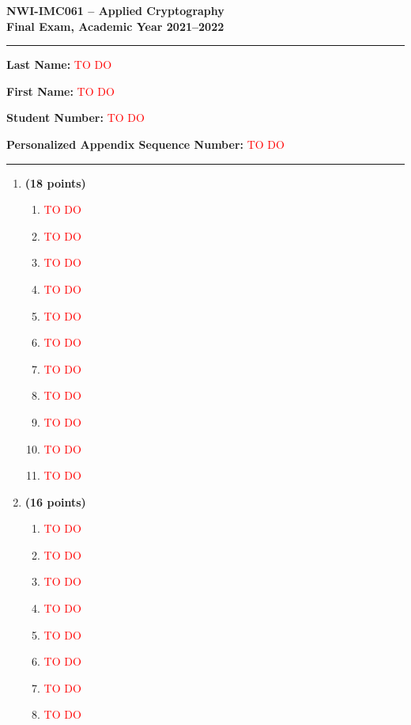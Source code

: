 \documentclass[a4paper]{article}
\newcommand{\TODO}{\textcolor{red}{TO DO}}
\begin{document}
\begin{center}
  \textbf{\Large NWI-IMC061 -- Applied Cryptography}\\[4pt]
  
  \textbf{\large Final Exam, Academic Year 2021--2022}
\end{center}

\bigskip
\hrule
\bigskip

\noindent \textbf{Last Name:} \TODO

\medskip\noindent \textbf{First Name:} \TODO

\medskip\noindent \textbf{Student Number:} \TODO

\medskip\noindent \textbf{Personalized Appendix Sequence Number:} \TODO

\bigskip
\hrule
\bigskip

\begin{enumerate}
\item \textbf{(18 points)} 
    \begin{enumerate}
    \item \TODO
    \item \TODO
    \item \TODO
    \item \TODO
    \item \TODO
    \item \TODO
    \item \TODO
    \item \TODO
    \item \TODO
    \item \TODO
    \item \TODO
    \end{enumerate}

\item \textbf{(16 points)} 
    \begin{enumerate}
    \item \TODO
    \item \TODO
    \item \TODO
    \item \TODO
    \item \TODO
    \item \TODO
    \item \TODO
    \item \TODO
    \end{enumerate}


\end{enumerate}
\end{document}
